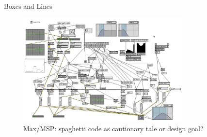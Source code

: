 \begin{frame}{Boxes and Lines}
    \begin{figure}
    \begin{centering}
    \includegraphics[height=2.25in]{assets/include-max.jpg}
    \caption{Max/MSP: spaghetti code as cautionary tale or design goal?}
    \end{centering}
    \end{figure}
\end{frame}